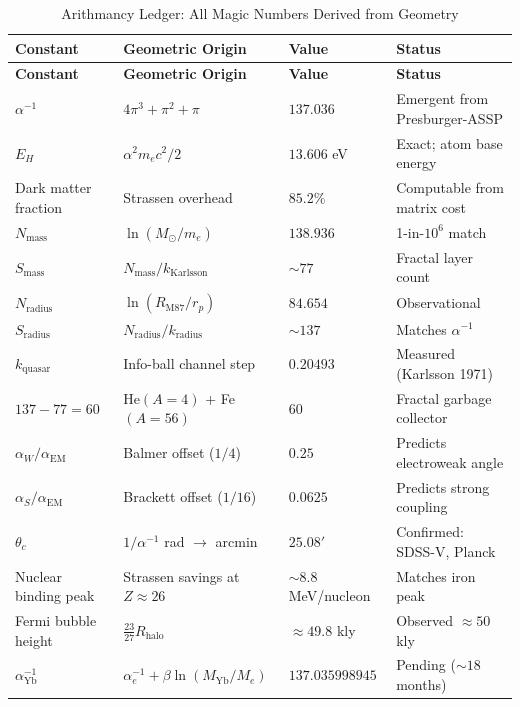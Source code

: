 \documentclass[11pt,a4paper]{article}
\begin{document}
\begin{longtable}{|p{2.8cm}|p{3.2cm}|p{2cm}|p{3cm}|}
\caption{Arithmancy Ledger: All Magic Numbers Derived from Geometry}\\
\hline
\textbf{Constant} & \textbf{Geometric Origin} & \textbf{Value} & \textbf{Status}\\
\hline\endfirsthead
\hline\textbf{Constant} & \textbf{Geometric Origin} & \textbf{Value} &
\textbf{Status}\\\hline\endhead
\hline\endfoot\hline\endlastfoot
$\alpha^{-1}$ & $4\pi^3+\pi^2+\pi$ & $137.036$ & Emergent from Presburger-ASSP \\
\hline
$E_H$ & $\alpha^2 m_e c^2/2$ & $13.606$ eV & Exact; atom base energy \\
\hline
Dark matter fraction & Strassen overhead & $85.2\%$ & Computable from matrix cost \\
\hline
$N_{\text{mass}}$ & $\ln(M_\odot/m_e)$ & $138.936$ & 1-in-$10^6$ match \\
\hline
$S_{\text{mass}}$ & $N_{\text{mass}}/k_{\text{Karlsson}}$ & $\sim77$ & Fractal layer count \\
\hline
$N_{\text{radius}}$ & $\ln(R_{\text{M87}}/r_p)$ & $84.654$ & Observational \\
\hline
$S_{\text{radius}}$ & $N_{\text{radius}}/k_{\text{radius}}$ & $\sim137$ & Matches $\alpha^{-1}$ \\
\hline
$k_{\text{quasar}}$ & Info-ball channel step & $0.20493$ & Measured (Karlsson 1971) \\
\hline
$137 - 77 = 60$ & He$(A=4)$ + Fe$(A=56)$ & $60$ & Fractal garbage collector \\
\hline
$\alpha_W/\alpha_{\text{EM}}$ & Balmer offset ($1/4$) & $0.25$ & Predicts electroweak angle \\
\hline
$\alpha_S/\alpha_{\text{EM}}$ & Brackett offset ($1/16$) & $0.0625$ & Predicts strong coupling \\
\hline
$\theta_c$ & $1/\alpha^{-1}$ rad $\to$ arcmin & $25.08'$ & Confirmed: SDSS-V, Planck \\
\hline
Nuclear binding peak & Strassen savings at $Z\approx26$ & $\sim8.8$ MeV/nucleon & Matches iron peak \\
\hline
Fermi bubble height & $\frac{23}{27} R_{\text{halo}}$ & $\approx49.8$ kly & Observed $\approx50$ kly \\
\hline
$\alpha^{-1}_{\text{Yb}}$ & $\alpha^{-1}_e+\beta\ln(M_{\text{Yb}}/M_e)$ &
$137.035998945$ & Pending ($\sim18$ months) \\
\hline
\end{longtable}
\end{document}
